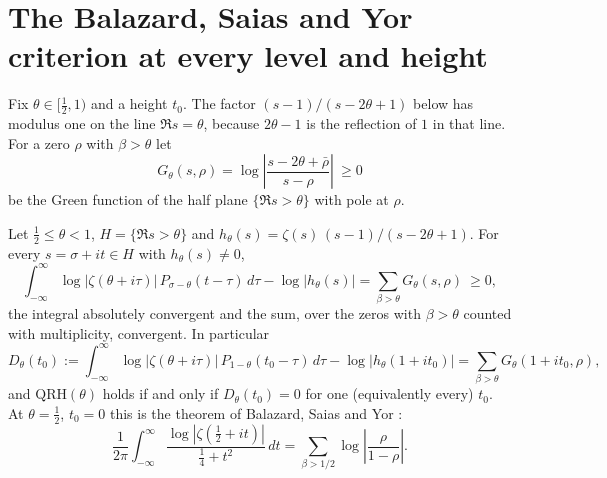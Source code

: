 \section{The Balazard, Saias and Yor criterion at every level and height}\label{bsy:sec:bsy}

Fix $\theta\in[\frac12,1)$ and a height $t_0$. The factor $(s-1)/(s-2\theta+1)$ below has modulus one on the line $\Re s=\theta$, because $2\theta-1$ is the reflection of $1$ in that line. For a zero $\rho$ with $\beta>\theta$ let
\[
G_\theta(s,\rho)=\log\left|\frac{s-2\theta+\bar\rho}{s-\rho}\right|\ \ge0
\]
be the Green function of the half plane $\{\Re s>\theta\}$ with pole at $\rho$.

\begin{theorem}\label{bsy:thm:bsy}
Let $\frac12\le\theta<1$, $H=\{\Re s>\theta\}$ and $h_\theta(s)=\zeta(s)\,(s-1)/(s-2\theta+1)$. For every $s=\sigma+it\in H$ with $h_\theta(s)\ne0$,
\begin{equation}\label{bsy:eq:nevanlinna}
\int_{-\infty}^{\infty}\log|\zeta(\theta+i\tau)|\,P_{\sigma-\theta}(t-\tau)\,d\tau-\log|h_\theta(s)|=\sum_{\beta>\theta}G_\theta(s,\rho)\ \ge0,
\end{equation}
the integral absolutely convergent and the sum, over the zeros with $\beta>\theta$ counted with multiplicity, convergent. In particular
\[
D_\theta(t_0):=\int_{-\infty}^\infty\log|\zeta(\theta+i\tau)|\,P_{1-\theta}(t_0-\tau)\,d\tau-\log|h_\theta(1+it_0)|=\sum_{\beta>\theta}G_\theta(1+it_0,\rho),
\]
and $\mathrm{QRH}(\theta)$ holds if and only if $D_\theta(t_0)=0$ for one (equivalently every) $t_0$. At $\theta=\frac12$, $t_0=0$ this is the theorem of Balazard, Saias and Yor \cite{BSY99}:
\[
\frac1{2\pi}\int_{-\infty}^\infty\frac{\log|\zeta(\frac12+it)|}{\frac14+t^2}\,dt=\sum_{\beta>1/2}\log\left|\frac{\rho}{1-\rho}\right| .
\]
\end{theorem}

